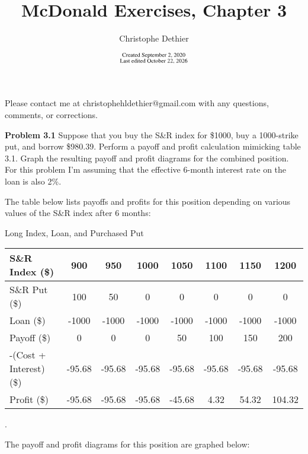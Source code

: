 \documentclass[12pt]{article}
\title{McDonald Exercises, Chapter 3}
\author{Christophe Dethier}
\date{$\substack{\text{Created September 2, 2020}\\\text{Last edited \today}}$}
\newcommand{\problem}[1]{\bigskip \noindent \textbf{Problem #1}}
\theoremstyle{plain}
\begin{document}
\bigskip
\maketitle

Please contact me at christophehldethier@gmail.com with any questions, comments, or corrections.

\problem{3.1} Suppose that you buy the S\&R index for \$1000, buy a 1000-strike put, and borrow \$980.39. Perform a payoff and profit calculation mimicking table 3.1. Graph the resulting payoff and profit diagrams for the combined position.\\

For this problem I'm assuming that the effective 6-month interest rate on the loan is also 2\%.

The table below lists payoffs and profits for this position depending on various values of the S\&R index after 6 months:

\begin{center}
Long Index, Loan, and Purchased Put
\begin{tabular}{l||ccccccc}
S\&R Index (\$) & 900 & 950 & 1000 & 1050 & 1100 & 1150 & 1200 \\ \hline \hline
S\&R Put (\$) & 100 & 50 & 0 & 0 & 0 & 0 & 0 \\
Loan (\$) & -1000 & -1000 & -1000 & -1000 & -1000 & -1000 & -1000 \\
Payoff (\$) & 0 & 0 & 0 & 50 & 100 & 150 & 200 \\
-(Cost + Interest) (\$) & -95.68 & -95.68 & -95.68 & -95.68 & -95.68 & -95.68 & -95.68 \\
Profit (\$) & -95.68 & -95.68 & -95.68 & -45.68 & 4.32 & 54.32 & 104.32
\end{tabular}.
\end{center}
The payoff and profit diagrams for this position are graphed below:

\begin{center}
\end{center}
\end{document}
